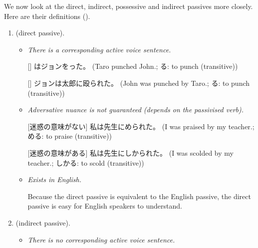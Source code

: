 \documentclass[../nihongo-gakushuu-kyouzai.tex]{subfiles}
\begin{document}
We now look at the direct, indirect, possessive and indirect passives more closely. Here are their definitions ().
\begin{enumerate}[label=\arabic*.]
    \item \textbf{} (direct passive).


    \begin{itemize}
        \item \emph{There is a corresponding active voice sentence.}

        [] はジョンをった。 (Taro punched John.; る: to punch (transitive))

        [] ジョンは太郎に殴られた。 (John was punched by Taro.; る: to punch (transitive))

        \item \emph{Adversative nuance is not guaranteed (depends on the passivised verb).}

        [迷惑の意味がない] 私は先生にめられた。 (I was praised by my teacher.; める: to praise (transitive))

        [迷惑の意味がある] 私は先生にしかられた。 (I was scolded by my teacher.; しかる: to scold (transitive))

        \item \emph{Exists in English.}

        Because the direct passive is equivalent to the English passive, the direct passive is easy for English speakers to understand.
    \end{itemize}
    \item \textbf{} (indirect passive).



    \begin{itemize}
        \item \emph{There is no corresponding active voice sentence.}


\end{itemize}
\end{enumerate}
\end{document}

